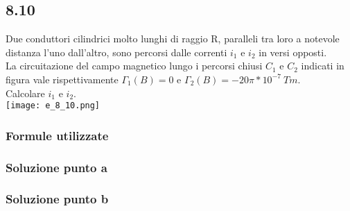 \documentclass[../../main.tex]{subfiles}
\begin{document}
\subsection*{8.10}
Due conduttori cilindrici molto lunghi di raggio R, paralleli tra loro a notevole distanza l'uno dall'altro, sono percorsi dalle correnti $i_1$ e $i_2$ in versi opposti.\\
La circuitazione del campo magnetico lungo i percorsi chiusi $C_1$ e $C_2$ indicati in figura vale rispettivamente $\Gamma_1(B) = 0$ e $\Gamma_2(B) = -20\pi * 10^{-7}\ Tm$.\\
Calcolare $i_1$ e $i_2$.\\
\texttt{[image: e\_8\_10.png]}
\subsubsection*{Formule utilizzate}
\subsubsection*{Soluzione punto a}
\subsubsection*{Soluzione punto b}
\newpage
\end{document}
